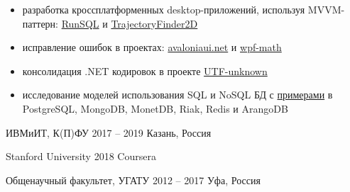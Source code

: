 \documentclass[10pt,a4paper,ragged2e,withhyper]{altacv}
\begin{document}
\begin{paracol}{2}
\begin{itemize}
  \item разработка кроссплатформенных desktop-приложений, используя MVVM-паттерн:
  \href{https://github.com/rstm-sf/RunSQL}{RunSQL} и
  \href{https://github.com/rstm-sf/TrajectoryFinder2D}{TrajectoryFinder2D}
  \smallskip

  \item исправление ошибок в проектах:
  \href{https://github.com/AvaloniaUI/avaloniaui.net/commits?author=rstm-sf}{avaloniaui.net} и
  \href{https://github.com/ForNeVeR/wpf-math/commits?author=rstm-sf}{wpf-math}
  \smallskip

  \item консолидация .NET кодировок в проекте 
  \href{https://github.com/CharsetDetector/UTF-unknown/commits?author=rstm-sf}{UTF-unknown}
  \smallskip

  \item исследование моделей использования SQL и NoSQL БД с
  \href{https://bitbucket.org/rstm-sf/game_with_db}{примерами} в
  PostgreSQL, MongoDB, MonetDB, Riak, Redis и ArangoDB

\end{itemize}

\switchcolumn




\smallskip
{}


{ИВМиИТ, К(П)ФУ}
{2017 -- 2019}
{Казань, Россия}

\divider

{Stanford University}
{2018}
{Coursera}

\divider

{Общенаучный факультет, УГАТУ}
{2012 -- 2017}
{Уфа, Россия}


\nocite{*}

\printbibliography[heading=pubtype,title={\printinfo{\faUsers}{Труды конференции}},type=inproceedings]

\end{paracol}
\end{document}

